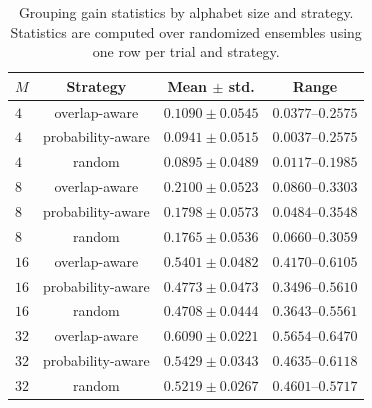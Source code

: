 \documentclass[
 reprint,
 amsmath,amssymb,
 aps,
 pra,
 floatfix,
]{revtex4-2}
\begin{document}
\begin{table}[!htb]
\caption{\label{tab:appendix_gain_stats}Grouping gain statistics by alphabet size and strategy. Statistics are computed over randomized ensembles using one row per trial and strategy.}
\begin{ruledtabular}
\begin{tabular}{lccc}
$M$ & Strategy & Mean $\pm$ std. & Range\\
\hline
$4$ & overlap-aware & $0.1090\pm0.0545$ & $0.0377$--$0.2575$\\
$4$ & probability-aware & $0.0941\pm0.0515$ & $0.0037$--$0.2575$\\
$4$ & random & $0.0895\pm0.0489$ & $0.0117$--$0.1985$\\
$8$ & overlap-aware & $0.2100\pm0.0523$ & $0.0860$--$0.3303$\\
$8$ & probability-aware & $0.1798\pm0.0573$ & $0.0484$--$0.3548$\\
$8$ & random & $0.1765\pm0.0536$ & $0.0660$--$0.3059$\\
$16$ & overlap-aware & $0.5401\pm0.0482$ & $0.4170$--$0.6105$\\
$16$ & probability-aware & $0.4773\pm0.0473$ & $0.3496$--$0.5610$\\
$16$ & random & $0.4708\pm0.0444$ & $0.3643$--$0.5561$\\
$32$ & overlap-aware & $0.6090\pm0.0221$ & $0.5654$--$0.6470$\\
$32$ & probability-aware & $0.5429\pm0.0343$ & $0.4635$--$0.6118$\\
$32$ & random & $0.5219\pm0.0267$ & $0.4601$--$0.5717$\\
\end{tabular}
\end{ruledtabular}
\end{table}
\end{document}
